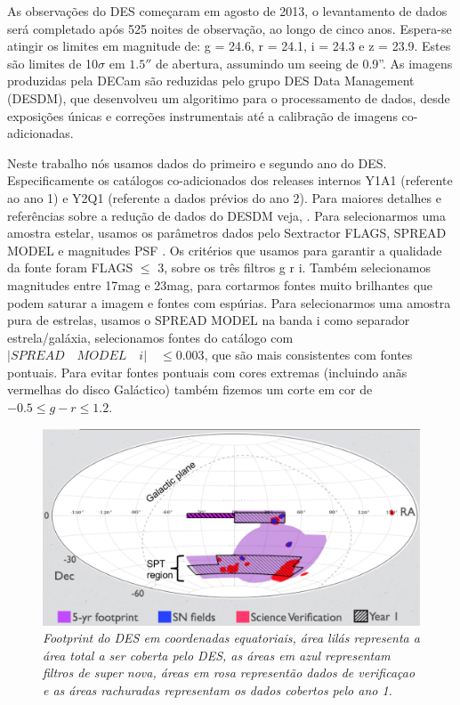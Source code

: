 \documentclass[
	12pt,				%
	openany,			%
	oneside,			%
	a4paper,			%
	english,			%
	brazil				%
	]{abntex2}
\begin{document}
As observações do DES começaram em agosto de 2013, o levantamento de dados será completado após 525 noites de observação, ao longo de cinco anos. Espera-se atingir os limites em magnitude de: g = 24.6, r = 24.1, i = 24.3 e z = 23.9. Estes são limites de 10$\sigma$ em $1.5''$ de abertura, assumindo um seeing de 0.9''.
As imagens produzidas pela DECam são reduzidas pelo grupo DES Data Management (DESDM), que desenvolveu um algoritimo para o processamento de dados, desde exposições únicas e correções instrumentais até a calibração de imagens co-adicionadas. \par
Neste trabalho nós usamos dados do primeiro e segundo ano do DES. Especificamente os catálogos co-adicionados  dos releases internos Y1A1 (referente ao ano 1) e Y2Q1 (referente a dados prévios do ano 2). Para maiores detalhes e referências sobre a redução de dados  do DESDM veja, \cite{2011arXiv1109.6741S,2012SPIE.8451E..0DM}. 
Para selecionarmos uma amostra estelar, usamos os parâmetros dados pelo Sextractor FLAGS, SPREAD MODEL e magnitudes PSF \cite{1996A&AS..117..393B,2012ApJ...757...83D}.
Os critérios que usamos para garantir a qualidade da fonte foram FLAGS $\le$ 3, sobre os três filtros  g r i. Também selecionamos magnitudes entre 17mag e 23mag, para cortarmos fontes muito brilhantes que podem saturar a imagem e fontes com espúrias. 
  Para selecionarmos uma amostra pura de estrelas, usamos o SPREAD MODEL na banda i como separador estrela/galáxia, selecionamos fontes do catálogo com $ |SPREAD \quad MODEL \quad i | \quad \le 0.003$, que são mais consistentes com fontes pontuais.    
Para evitar fontes pontuais com cores extremas (incluindo anãs vermelhas do disco Galáctico) também fizemos um corte em cor de  $-0.5 \le g-r \le 1.2$.



\begin{figure}[h]
\begin{center}
\includegraphics[width=12cm]{figuras/footprintdes.pdf}
\caption{\textit{Footprint do DES em coordenadas equatoriais, área lilás representa a área total a ser coberta pelo DES, as áreas em azul representam filtros de super nova, áreas em rosa representão dados de verificaçao e as áreas rachuradas representam os dados cobertos pelo ano 1.}}
\label{fig:footprintdes}
\end{center}
\end{figure}
\vspace{0.5cm}
\end{document}
